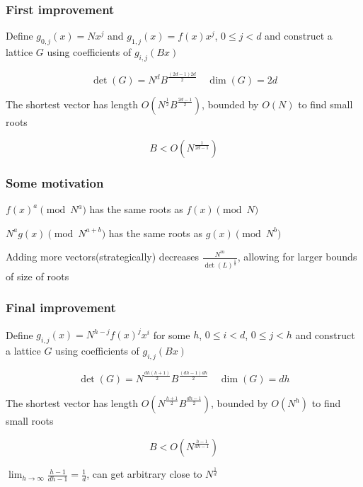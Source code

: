 \documentclass{beamer}
\begin{document}
\begin{frame}
    \frametitle{First improvement}
    Define $g_{0,j}(x)=Nx^j$ and $g_{1,j}(x)=f(x)x^j$, $0\leq j<d$ and construct a lattice $G$ using coefficients of $g_{i,j}(Bx)$

    $$\det(G)=N^dB^{\frac{(2d-1)2d}2}\quad\dim(G)=2d$$

    The shortest vector has length $O\left(N^{\frac12}B^{\frac{2d-1}2}\right)$, bounded by $O(N)$ to find small roots

    $$B<O\left(N^{\frac1{2d-1}}\right)$$
\end{frame}

\begin{frame}
    \frametitle{Some motivation}
    $f(x)^a\pmod{N^a}$ has the same roots as $f(x)\pmod N$\pause

    $N^ag(x)\pmod{N^{a+b}}$ has the same roots as $g(x)\pmod{N^b}$\pause

    Adding more vectors(strategically) decreases $\frac{N^m}{\det(L)^{\frac1d}}$, allowing for larger bounds of size of roots
\end{frame}

\begin{frame}
    \frametitle{Final improvement}
    Define $g_{i,j}(x)=N^{h-j}f(x)^jx^i$ for some $h$, $0\leq i<d$, $0\leq j<h$ and construct a lattice $G$ using coefficients of $g_{i,j}(Bx)$
    
    $$\det(G)=N^{\frac{dh(h+1)}2}B^{\frac{(dh-1)dh}2}\quad\dim(G)=dh$$

    The shortest vector has length $O\left(N^{\frac{h+1}2}B^{\frac{dh-1}2}\right)$, bounded by $O\left(N^h\right)$ to find small roots

    $$B<O\left(N^{\frac{h-1}{dh-1}}\right)$$

    $\lim_{h\to\infty}\frac{h-1}{dh-1}=\frac1d$, can get arbitrary close to $N^{\frac1d}$
\end{frame}
\end{document}
